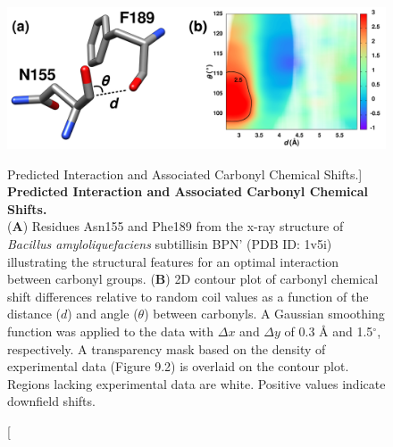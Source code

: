 \begin{figure}[ht!]
\includegraphics[width=6.5in]{figs/npistar/01-geometry.png}
\caption
      [Predicted \npistar{} Interaction and Associated Carbonyl \cnmr{}
       Chemical Shifts.]{
  {\bf Predicted \npistar{} Interaction and Associated Carbonyl \cnmr{}
       Chemical Shifts.
  }
  \\
  ({\bf A}) Residues Asn155 and Phe189 from the x-ray structure of
  \emph{Bacillus amyloliquefaciens} subtillisin BPN' (PDB ID: 1v5i)
  illustrating the structural features for an optimal \npistar{} interaction
  between carbonyl groups.
  ({\bf B}) 2D contour plot of carbonyl \cnmr{} chemical shift differences
  relative to random coil values as a function of the distance ($d$) and
  angle ($\theta$) between carbonyls. A Gaussian smoothing function was
  applied to the data with $\Delta x$ and $\Delta y$ of 0.3 \r{A} and
  1.5$^\circ$, respectively. A transparency mask based on the density of
  experimental data (Figure 9.2) is overlaid on the
  contour plot. Regions lacking experimental data are white.
  Positive values indicate downfield shifts.
}
\end{figure}

